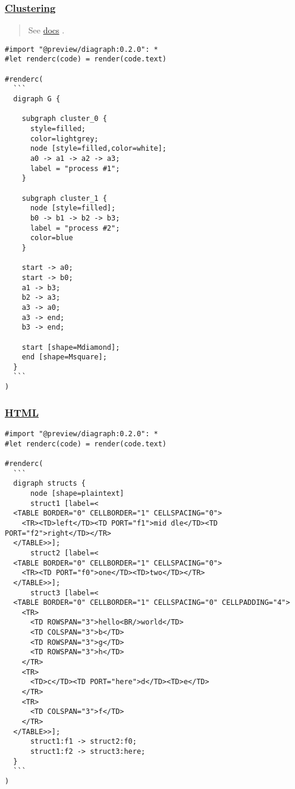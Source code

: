 \pandocbounded{}

\subsubsection{\texorpdfstring{\hyperref[clustering]{Clustering}}{Clustering}}\label{clustering}

\begin{quote}
See \href{http://www.graphviz.org/content/cluster}{docs} .
\end{quote}

\begin{verbatim}
#import "@preview/diagraph:0.2.0": *
#let renderc(code) = render(code.text)

#renderc(
  ```
  digraph G {

    subgraph cluster_0 {
      style=filled;
      color=lightgrey;
      node [style=filled,color=white];
      a0 -> a1 -> a2 -> a3;
      label = "process #1";
    }

    subgraph cluster_1 {
      node [style=filled];
      b0 -> b1 -> b2 -> b3;
      label = "process #2";
      color=blue
    }

    start -> a0;
    start -> b0;
    a1 -> b3;
    b2 -> a3;
    a3 -> a0;
    a3 -> end;
    b3 -> end;

    start [shape=Mdiamond];
    end [shape=Msquare];
  }
  ```
)
\end{verbatim}

\pandocbounded{}

\subsubsection{\texorpdfstring{\hyperref[html]{HTML}}{HTML}}\label{html}

\begin{verbatim}
#import "@preview/diagraph:0.2.0": *
#let renderc(code) = render(code.text)

#renderc(
  ```
  digraph structs {
      node [shape=plaintext]
      struct1 [label=<
  <TABLE BORDER="0" CELLBORDER="1" CELLSPACING="0">
    <TR><TD>left</TD><TD PORT="f1">mid dle</TD><TD PORT="f2">right</TD></TR>
  </TABLE>>];
      struct2 [label=<
  <TABLE BORDER="0" CELLBORDER="1" CELLSPACING="0">
    <TR><TD PORT="f0">one</TD><TD>two</TD></TR>
  </TABLE>>];
      struct3 [label=<
  <TABLE BORDER="0" CELLBORDER="1" CELLSPACING="0" CELLPADDING="4">
    <TR>
      <TD ROWSPAN="3">hello<BR/>world</TD>
      <TD COLSPAN="3">b</TD>
      <TD ROWSPAN="3">g</TD>
      <TD ROWSPAN="3">h</TD>
    </TR>
    <TR>
      <TD>c</TD><TD PORT="here">d</TD><TD>e</TD>
    </TR>
    <TR>
      <TD COLSPAN="3">f</TD>
    </TR>
  </TABLE>>];
      struct1:f1 -> struct2:f0;
      struct1:f2 -> struct3:here;
  }
  ```
)
\end{verbatim}

